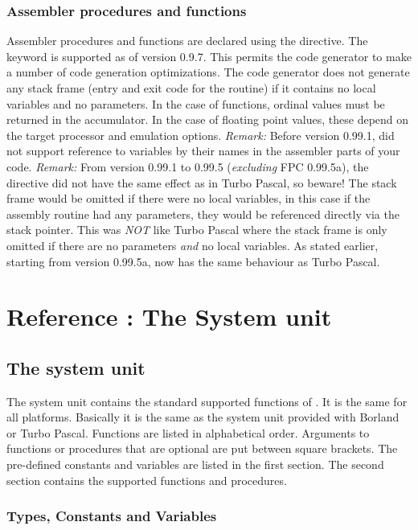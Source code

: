 \documentclass{report}
\begin{document}
\section{Assembler procedures and functions}
Assembler procedures and functions are declared using the
 directive. The  keyword is supported
as of version 0.9.7. This permits the code generator to make a number
of code generation optimizations.
The code generator does not generate any stack frame (entry and exit
code for the routine) if it contains no local variables and no
parameters. In the case of functions, ordinal values must be returned
in the accumulator. In the case of floating point values, these depend
on the target processor and emulation options.
\emph{ Remark: } Before version 0.99.1, \fpc did not support
reference to variables by their names in the assembler parts of your code.
\emph{ Remark: } From version 0.99.1 to 0.99.5 (\emph{excluding}
FPC 0.99.5a), the  directive did not have the
same effect as in Turbo Pascal, so beware! The stack frame would be
omitted if there were no local variables, in this case if the assembly
routine had any parameters, they would be referenced directly via the stack
pointer. This was \emph{ NOT} like Turbo Pascal where the stack frame is only
omitted if there are no parameters \emph{ and } no local variables. As
stated earlier, starting from version 0.99.5a, \fpc now has the same
behaviour as Turbo Pascal.
%
%
\part{Reference : The System unit}
\chapter{The system unit}
\label{ch:refchapter}
The system unit contains the standard supported functions of \fpc. It is the
same for all platforms. Basically it is the same as the system unit provided
with Borland or Turbo Pascal. 
Functions are listed in alphabetical order.
Arguments to functions or procedures that are optional are put between
square brackets.
The pre-defined constants and variables are listed in the first section. The
second section contains the supported functions and procedures.
\section{Types, Constants and Variables}
\end{document}

